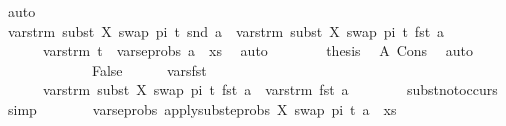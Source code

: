 \begin{isabellebody}
\ auto\isanewline
\ \ \ \ \ \ \isamarkupfalse%
\ {\isachardoublequoteopen}vars{\isacharunderscore}{\kern0pt}trm\ {\isacharparenleft}{\kern0pt}subst\ {\isacharbrackleft}{\kern0pt}{\isacharparenleft}{\kern0pt}X{\isacharcomma}{\kern0pt}\ swap\ pi\ t{\isacharparenright}{\kern0pt}{\isacharbrackright}{\kern0pt}\ {\isacharparenleft}{\kern0pt}snd\ a{\isacharparenright}{\kern0pt}{\isacharparenright}{\kern0pt}\ {\isasymunion}\ vars{\isacharunderscore}{\kern0pt}trm\ {\isacharparenleft}{\kern0pt}subst\ {\isacharbrackleft}{\kern0pt}{\isacharparenleft}{\kern0pt}X{\isacharcomma}{\kern0pt}\ swap\ pi\ t{\isacharparenright}{\kern0pt}{\isacharbrackright}{\kern0pt}\ {\isacharparenleft}{\kern0pt}fst\ a{\isacharparenright}{\kern0pt}{\isacharparenright}{\kern0pt}\ {\isasymsubseteq}\ \isanewline
\ \ \ \ \ \ vars{\isacharunderscore}{\kern0pt}trm\ t\ {\isasymunion}\ vars{\isacharunderscore}{\kern0pt}eprobs\ {\isacharparenleft}{\kern0pt}a\ {\isacharhash}{\kern0pt}\ xs{\isacharparenright}{\kern0pt}{\isachardoublequoteclose}\ \isamarkupfalse%
\ auto\isanewline
\ \ \ \ \ \ \isamarkupfalse%
\ {\isacharquery}{\kern0pt}thesis\ \isamarkupfalse%
\ A\ Cons\ \isamarkupfalse%
\ auto\isanewline
\ \ \ \ \isamarkupfalse%
\isanewline
\ \ \isamarkupfalse%
\isanewline
\ \ \ \ \isamarkupfalse%
\ False\isanewline
\ \ \ \ \isamarkupfalse%
\ vars{\isacharunderscore}{\kern0pt}fst{\isacharcolon}{\kern0pt}\isanewline
\ \ \ \ \ \ {\isachardoublequoteopen}vars{\isacharunderscore}{\kern0pt}trm\ {\isacharparenleft}{\kern0pt}subst\ {\isacharbrackleft}{\kern0pt}{\isacharparenleft}{\kern0pt}X{\isacharcomma}{\kern0pt}\ swap\ pi\ t{\isacharparenright}{\kern0pt}{\isacharbrackright}{\kern0pt}\ {\isacharparenleft}{\kern0pt}fst\ a{\isacharparenright}{\kern0pt}{\isacharparenright}{\kern0pt}\ {\isacharequal}{\kern0pt}\ vars{\isacharunderscore}{\kern0pt}trm\ {\isacharparenleft}{\kern0pt}fst\ a{\isacharparenright}{\kern0pt}{\isachardoublequoteclose}\isanewline
\ \ \ \ \ \ \isamarkupfalse%
\ subst{\isacharunderscore}{\kern0pt}not{\isacharunderscore}{\kern0pt}occurs\ \isamarkupfalse%
\ simp\isanewline
\ \ \ \ \isamarkupfalse%
\ \isamarkupfalse%
\ {\isachardoublequoteopen}vars{\isacharunderscore}{\kern0pt}eprobs\ {\isacharparenleft}{\kern0pt}apply{\isacharunderscore}{\kern0pt}subst{\isacharunderscore}{\kern0pt}eprobs\ {\isacharbrackleft}{\kern0pt}{\isacharparenleft}{\kern0pt}X{\isacharcomma}{\kern0pt}\ swap\ pi\ t{\isacharparenright}{\kern0pt}{\isacharbrackright}{\kern0pt}\ {\isacharparenleft}{\kern0pt}a\ {\isacharhash}{\kern0pt}\ xs{\isacharparenright}{\kern0pt}{\isacharparenright}{\kern0pt}\isanewline

\end{isabellebody}
